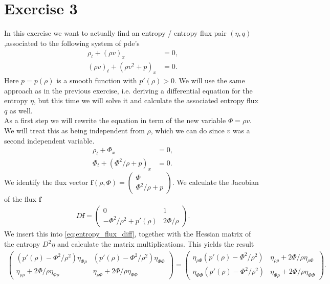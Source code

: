 \section{Exercise 3}
In this exercise we want to actually find an entropy / entropy flux pair $(\eta,q)$,associated to the following system of pde's
\begin{align}
\rho_t +(\rho v)_x &=0,\\
(\rho v)_t +(\rho v^2 +p)_x &=0.
\end{align}
Here $p = p(\rho)$ is a smooth function with $p'(\rho)>0$.  We will use the same approach as in the previous exercise, i.e. deriving a differential equation for the entropy $\eta$, but this time we will solve it and calculate the associated entropy flux $q$ as well. \\
As a first step we will rewrite the equation in term of the new variable $\Phi = \rho v$. We will treat this as being independent from $\rho$, which we can do since $v$ was a second independent variable.
\begin{align}
\rho_t +\Phi_x &=0,\\
\Phi_t +(\Phi^2 / \rho +p)_x &=0.
\end{align}
We identify the flux vector $\bm f(\rho, \Phi) = \begin{pmatrix} \Phi \\ \Phi^2/\rho +p \end{pmatrix} $. 
We calculate the Jacobian of the flux $\bm f$
\begin{align}
D\bm f=\begin{pmatrix}
0 & 1 \\
-\Phi^2/\rho^2 +p'(\rho) & 2\Phi/\rho
\end{pmatrix}.
\end{align}
We insert this into \cref{eq:entropy_flux_diff}, together with the Hessian matrix of the entropy $D^2 \eta$ and calculate the matrix multiplications. This yields the result
\begin{align}
\begin{pmatrix}
(p'(\rho)-\Phi^2/\rho^2)\eta_{\Phi\rho} & (p'(\rho)-\Phi^2/\rho^2) \eta_{\Phi\Phi}\\
\eta_{\rho\rho}+2\Phi/\rho\eta_{\Phi\rho} & \eta_{\rho\Phi} + 2\Phi/\rho \eta_{\Phi\Phi} 
\end{pmatrix}
=
\begin{pmatrix}
\eta_{\rho\Phi}(p'(\rho)-\Phi^2/\rho^2) & \eta_{\rho\rho} +2\Phi/\rho \eta_{\rho \Phi}\\
\eta_{\Phi\Phi}(p'(\rho)-\Phi^2/\rho^2) & \eta_{\Phi\rho}+ 2\Phi/\rho \eta_{\Phi\Phi}
\end{pmatrix}.
\end{align}
